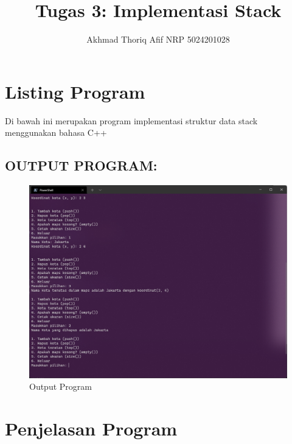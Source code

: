 \documentclass[]{article}
\title{Tugas 3: Implementasi Stack}
\author{Akhmad Thoriq Afif NRP 5024201028}
\begin{document}
\maketitle
\section{Listing Program}
Di bawah ini merupakan program implementasi struktur data stack menggunakan bahasa C++

\pagebreak
\subsection*{OUTPUT PROGRAM:}
\begin{figure}[htp]
    \centering
    \includegraphics[width=12cm]{output.png}
    \caption{Output Program}
    \label{fig:galaxy}
\end{figure}
\pagebreak
\section{Penjelasan Program}
\end{document}
